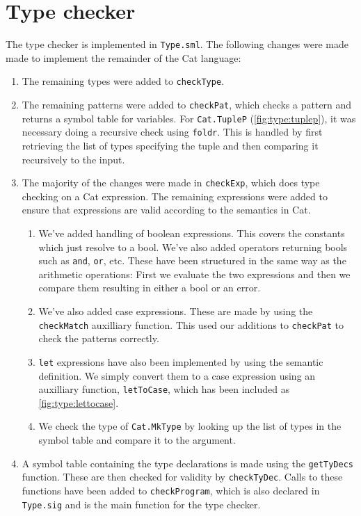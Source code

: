 \chapter{Type checker}

The type checker is implemented in \texttt{Type.sml}. The following changes
were made made to implement the remainder of the Cat language:

\begin{enumerate}
    \item {
        The remaining types were added to \texttt{checkType}.
    }
    \item {
        The remaining patterns were added to \texttt{checkPat}, which
        checks a pattern and returns a symbol table for variables.
        For \texttt{Cat.TupleP} (\autoref{fig:type:tuplep}), it was
        necessary doing a recursive check using \texttt{foldr}. This is
        handled by first retrieving the list of types specifying the
        tuple and then comparing it recursively to the input.
    }
    \item {
        The majority of the changes were made in \texttt{checkExp}, which does
        type checking on a Cat expression. The remaining expressions were
        added to ensure that expressions are valid according to the semantics
        in Cat.
        \begin{enumerate}
        \item {
            We've added handling of boolean expressions. This covers the
            constants which just resolve to a bool. We've also added operators
            returning bools such as \texttt{and}, \texttt{or}, etc. These
            have been structured in the same way as the arithmetic operations:
            First we evaluate the two expressions and then we compare them
            resulting in either a bool or an error.
        }
        \item {
            We've also added case expressions. These are made by using the 
            \texttt{checkMatch} auxilliary function. This used our additions to
            \texttt{checkPat} to check the patterns correctly.
        }
        \item {
            \texttt{let} expressions have also been implemented by using the
            semantic definition. We simply convert them to a case expression
            using an auxilliary function, \texttt{letToCase}, which has been
            included as \autoref{fig:type:lettocase}.
        }
        \item {
            We check the type of \texttt{Cat.MkType} by looking up the list of
            types in the symbol table and compare it to the argument.
        }
        \end{enumerate}
    }
    \item {
        A symbol table containing the type declarations is made using the
        \texttt{getTyDecs} function. These are then checked for validity by
        \texttt{checkTyDec}. Calls to these functions have been added to
        \texttt{checkProgram}, which is also declared in \texttt{Type.sig} and
        is the main function for the type checker.
    }
\end{enumerate}
